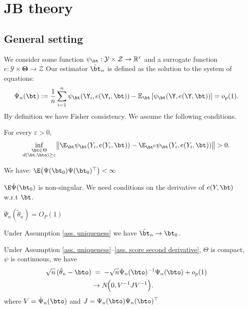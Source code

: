 \section{JB theory}

\newcommand{\R}{\mathbb{R}}

\subsection{General setting}

We consider some function $\psi_\bt:\mathcal{Y}\times \mathcal{Z} \to \mathbb{R}^r$ and a surrogate function $e : \mathcal{Y} \times \bm{\Theta} \to \mathcal{Z}$
Our estimator $\hat\bt_n$ is defined as the solution to the system of equations:
\begin{equation}
\Psi_n(\bt) := \frac{1}{n} \sum_{i=1}^n \psi_\bt(\Y_i, e(\Y_i, \bt)) 
-
\mathbb{E}_\bt
\left[ 
\psi_\bt(\Y, e(\Y, \bt)) 
\right] = o_p(1).
\end{equation}
By definition we have Fisher consistency.
We assume the following conditions.

\begin{assumptionA}\label{ass. uniqueness}
For every $\varepsilon>0$,
$$
\inf_{\substack{\bt\in\Theta\\d(\bt,\bto)\ge\varepsilon}}
\bigl\| \E_\bt \psi_\bt(Y_i, e(Y_i,\bt) ) - \E_{\bt^0} \psi_\bt(Y_i, e(Y_i,\bt) ) \bigr\|
>0.
$$
\end{assumptionA}

\begin{assumptionA}\label{ass. bounded squared score}
We have:
$\E \bigl(\Psi(\bt_0) \Psi(\bt_0)^\top \bigr)<\infty$
\end{assumptionA}

\begin{assumptionA}\label{ass. score derivative}
$\E\dot\Psi(\bt_0)$ is non-singular. We need conditions on the derivative of $e(Y,\bt)$ w.r.t $\bt$.
\end{assumptionA}

\begin{assumptionA}\label{ass. score second derivative}
$\ddot\Psi_n(\tilde\theta_n)=O_P(1)$
\end{assumptionA}


\begin{theorem}
Under Assumption \ref{ass. uniqueness} we have $ \hat\bt_n \to \bt_0$.
\end{theorem}

\begin{theorem}
Under Assumption \ref{ass. uniqueness}--\ref{ass. score second derivative}, $\Theta$ is compact, %
$\psi$ is continuous, we have
\begin{align*}
  \sqrt{n}\,(\hat\theta_n - \bto)
  &\;=\;
  - \sqrt{n} \dot\Psi_n(\bto)^{-1} \Psi_n(\bto) +o_p(1) \\
  &\rightarrow N\!\Bigl(0, V^{-1} J V^{-1} \Bigr).
\end{align*}
where $V =\dot\Psi_n(\bto) $ and $J= \Psi_n(\bto) \Psi_n(\bto)^\top$
\end{theorem}




